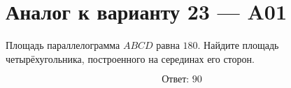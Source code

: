 


\section*{Аналог к варианту 23 — A01}
Площадь параллелограмма \(ABCD\) равна \(180\). Найдите площадь четырёхугольника, построенного на серединах его сторон.
\begin{center}\figParallelogramMidpoints\end{center}
\[\boxed{\text{Ответ: }90}\]

